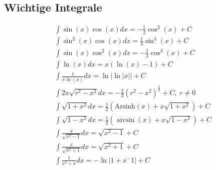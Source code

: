 \subsection{Wichtige Integrale}
    \begin{align*}
        &\int \sin(x) \cos(x) dx = - \frac{1}{2} \cos^2(x) + C\\
        &\int \sin^2(x) \cos(x) dx = \frac{1}{3} \sin^3(x) + C\\
        &\int \sin(x) \cos^2(x) dx = - \frac{1}{3} \cos^3(x) + C\\
        &\int \ln(x) dx = x(\ln(x) -1) + C\\
        &\int \frac{1}{x \ln(x)} dx = \ln|\ln|x|| + C\\
        &\int 2x \sqrt{r^2 - x^2} dx = -\frac{2}{3} (r^2-x^2)^\frac{3}{2} + C, \; r \neq 0\\
        &\int \sqrt{1+x^2} dx = \frac{1}{2} \left(\textrm{Arsinh}(x) + x \sqrt{1+x^2}\right) + C\\
        &\int \sqrt{1-x^2} dx = \frac{1}{2} \left(\arcsin(x) + x \sqrt{1-x^2}\right) + C\\
        &\int \frac{x}{\sqrt{x^2-1}} dx = \sqrt{x^2-1} + C\\
        &\int \frac{x}{\sqrt{x^2+1}} dx = \sqrt{x^2+1} + C\\
        &\int \frac{1}{x^2+x} dx = -\ln|1+x^-1| + C\\
    \end{align*}